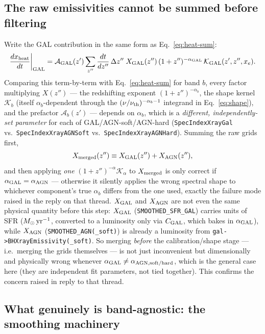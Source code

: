 \documentclass[11pt]{article}
\newcommand{\code}[1]{\texttt{#1}}
\begin{document}
\subsection{The raw emissivities cannot be summed before filtering}
\label{sec:merge-no}

Write the GAL contribution in the same form as Eq.~\eqref{eq:heat-sum}:
\begin{equation}
  \frac{dx_{\rm heat}}{dt}\bigg|_{\rm GAL} =
    \mathcal{A}_{\rm GAL}(z') \sum_{z''} \frac{dt}{dz''}\,\Delta z''\;
    X_{\rm GAL}(z'')\,(1+z'')^{-\alpha_{\rm GAL}}\, \mathcal{K}_{\rm GAL}(z',z'',x_e).
  \label{eq:heat-sum-gal}
\end{equation}
Comparing this term-by-term with Eq.~\eqref{eq:heat-sum} for band $b$, every
factor multiplying $X(z'')$ — the redshifting exponent
$(1+z'')^{-\alpha_b}$, the shape kernel $\mathcal{K}_b$ (itself
$\alpha_b$-dependent through the $(\nu/\nu_{\rm th})^{-\alpha_b-1}$ integrand
in Eq.~\eqref{eq:shape}), and the prefactor $\mathcal{A}_b(z')$ — depends on
$\alpha_b$, which is a \emph{different, independently-set parameter} for
each of GAL/AGN-soft/AGN-hard (\code{SpecIndexXrayGal} vs.\
\code{SpecIndexXrayAGNSoft} vs.\ \code{SpecIndexXrayAGNHard}). Summing the
raw grids first,
\begin{equation}
  X_{\rm merged}(z'') \equiv X_{\rm GAL}(z'') + X_{\rm AGN}(z''),
\end{equation}
and then applying \emph{one} $(1+z'')^{-\alpha}\mathcal{K}_\alpha$ to
$X_{\rm merged}$ is only correct if $\alpha_{\rm GAL}=\alpha_{\rm AGN}$ —
otherwise it silently applies the wrong spectral shape to whichever
component's true $\alpha_b$ differs from the one used, exactly the failure
mode raised in the reply on that thread. $X_{\rm GAL}$ and $X_{\rm AGN}$
are not even the same physical quantity before this step: $X_{\rm GAL}$
(\code{SMOOTHED\_SFR\_GAL}) carries units of SFR ($M_\odot\,{\rm yr}^{-1}$,
converted to a luminosity only via $C_{\rm GAL}$, which bakes in
$\alpha_{\rm GAL}$), while $X_{\rm AGN}$ (\code{SMOOTHED\_AGN(\_soft)}) is
already a luminosity from \code{gal->BHXrayEmissivity(\_soft)}. So merging
\emph{before} the calibration/shape stage — i.e.\ merging the grids
themselves — is not just inconvenient but dimensionally and physically
wrong whenever $\alpha_{\rm GAL}\neq\alpha_{\rm AGN,soft/hard}$, which is
the general case here (they are independent fit parameters, not tied
together). This confirms the concern raised in reply to that thread.

\subsection{What genuinely is band-agnostic: the smoothing machinery}
\label{sec:merge-yes}
\end{document}
